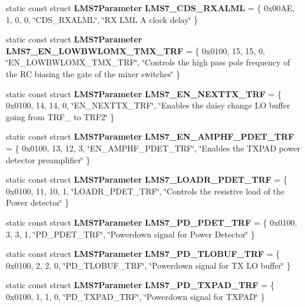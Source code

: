 \begin{DoxyCompactItemize}
\item 
static const struct {\bf L\+M\+S7\+Parameter} {\bf L\+M\+S7\+\_\+\+C\+D\+S\+\_\+\+R\+X\+A\+L\+ML} = \{ 0x00\+A\+E, 1, 0, 0, \char`\"{}\+C\+D\+S\+\_\+\+R\+X\+A\+L\+M\+L\char`\"{}, \char`\"{}\+R\+X L\+M\+L A clock delay\char`\"{} \}
\item 
static const struct {\bf L\+M\+S7\+Parameter} {\bf L\+M\+S7\+\_\+\+E\+N\+\_\+\+L\+O\+W\+B\+W\+L\+O\+M\+X\+\_\+\+T\+M\+X\+\_\+\+T\+RF} = \{ 0x0100, 15, 15, 0, \char`\"{}\+E\+N\+\_\+\+L\+O\+W\+B\+W\+L\+O\+M\+X\+\_\+\+T\+M\+X\+\_\+\+T\+R\+F\char`\"{}, \char`\"{}\+Controls the high pass pole frequency of the R\+C biasing the gate of the mixer switches\char`\"{} \}
\item 
static const struct {\bf L\+M\+S7\+Parameter} {\bf L\+M\+S7\+\_\+\+E\+N\+\_\+\+N\+E\+X\+T\+T\+X\+\_\+\+T\+RF} = \{ 0x0100, 14, 14, 0, \char`\"{}\+E\+N\+\_\+\+N\+E\+X\+T\+T\+X\+\_\+\+T\+R\+F\char`\"{}, \char`\"{}\+Enables the daisy change L\+O buffer going from T\+R\+F\+\_ to T\+R\+F2\char`\"{} \}
\item 
static const struct {\bf L\+M\+S7\+Parameter} {\bf L\+M\+S7\+\_\+\+E\+N\+\_\+\+A\+M\+P\+H\+F\+\_\+\+P\+D\+E\+T\+\_\+\+T\+RF} = \{ 0x0100, 13, 12, 3, \char`\"{}\+E\+N\+\_\+\+A\+M\+P\+H\+F\+\_\+\+P\+D\+E\+T\+\_\+\+T\+R\+F\char`\"{}, \char`\"{}\+Enables the T\+X\+P\+A\+D power detector preamplifier\char`\"{} \}
\item 
static const struct {\bf L\+M\+S7\+Parameter} {\bf L\+M\+S7\+\_\+\+L\+O\+A\+D\+R\+\_\+\+P\+D\+E\+T\+\_\+\+T\+RF} = \{ 0x0100, 11, 10, 1, \char`\"{}\+L\+O\+A\+D\+R\+\_\+\+P\+D\+E\+T\+\_\+\+T\+R\+F\char`\"{}, \char`\"{}\+Controls the resistive load of the Power detector\char`\"{} \}
\item 
static const struct {\bf L\+M\+S7\+Parameter} {\bf L\+M\+S7\+\_\+\+P\+D\+\_\+\+P\+D\+E\+T\+\_\+\+T\+RF} = \{ 0x0100, 3, 3, 1, \char`\"{}\+P\+D\+\_\+\+P\+D\+E\+T\+\_\+\+T\+R\+F\char`\"{}, \char`\"{}\+Powerdown signal for Power Detector\char`\"{} \}
\item 
static const struct {\bf L\+M\+S7\+Parameter} {\bf L\+M\+S7\+\_\+\+P\+D\+\_\+\+T\+L\+O\+B\+U\+F\+\_\+\+T\+RF} = \{ 0x0100, 2, 2, 0, \char`\"{}\+P\+D\+\_\+\+T\+L\+O\+B\+U\+F\+\_\+\+T\+R\+F\char`\"{}, \char`\"{}\+Powerdown signal for T\+X L\+O buffer\char`\"{} \}
\item 
static const struct {\bf L\+M\+S7\+Parameter} {\bf L\+M\+S7\+\_\+\+P\+D\+\_\+\+T\+X\+P\+A\+D\+\_\+\+T\+RF} = \{ 0x0100, 1, 1, 0, \char`\"{}\+P\+D\+\_\+\+T\+X\+P\+A\+D\+\_\+\+T\+R\+F\char`\"{}, \char`\"{}\+Powerdown signal for T\+X\+P\+A\+D\char`\"{} \}

\end{DoxyCompactItemize}
